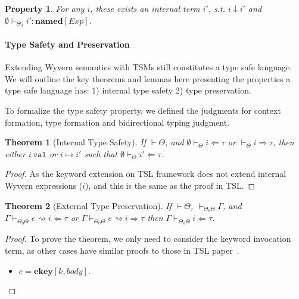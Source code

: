 \documentclass{sig-alternate}
\newcommand{\myvdash}{\vdash_{\Theta}^{\Delta}}
\newtheorem{theorem}{Theorem}
\newtheorem{property}{Property}
\begin{document}
\begin{property}
For any $i$, these exists an internal term $i'$, s.t. $i\downarrow i'$ and $\emptyset\vdash_{\Theta_0} i':\mathbf{named}[Exp]$.
\end{property}

\paragraph{Type Safety and Preservation}
Extending Wyvern semantics with TSMs still constitutes a type safe language. We will outline the key theorems and lemmas here presenting the properties a type safe language has: 1) internal type safety 2) type preservation. 

To formalize the type safety property, we defined the judgments for context formation, type formation and bidirectional typing judgment. 

\begin{theorem}[Internal Type Safety]
If $\vdash\Theta$, and $\emptyset\vdash_{\Theta}i\Leftarrow\tau$ or $\vdash_{\Theta}i\Rightarrow\tau$, then either $i~\texttt{val}$ or $i\mapsto i'$ such that $\emptyset\vdash_{\Theta}i'\Leftarrow\tau$.
\end{theorem}
\begin{proof}
As the keyword extension on TSL framework does not extend internal Wyvern expressions ($i$), and this is the same as the proof in TSL. 
\end{proof}

\begin{theorem}[External Type Preservation]
If $\vdash\Theta$, $\vdash_{\Theta_0\Theta}\Gamma$, and $\Gamma\vdash_{\Theta_0\Theta} e\rightsquigarrow i\Leftarrow\tau$ or $\Gamma\vdash_{\Theta_0\Theta} e\rightsquigarrow i\Rightarrow\tau$ then $\Gamma\vdash_{\Theta_0\Theta} i\Leftarrow\tau$.
\end{theorem}
\begin{proof}

To prove the theorem, we only need to consider the keyword invocation term, as other cases have similar proofs to those in TSL paper~\cite{TSLs}.
\begin{itemize}
\item $e=\mathbf{ekey}[k,body]$. 
\end{itemize} 
\end{proof}
\end{document}
